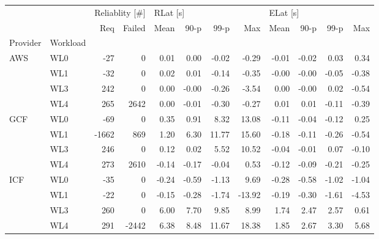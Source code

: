 \begin{tabular}{llrrrrrrrrrr}
\toprule
    &     & \multicolumn{2}{l}{Reliablity [\#]} & \multicolumn{4}{l}{RLat [s]} & \multicolumn{4}{l}{ELat [s]} \\
    &     &            Req & Failed &     Mean &  90-p &  99-p &    Max &     Mean &  90-p &  99-p &   Max \\
Provider & Workload &                &        &          &       &       &        &          &       &       &       \\
\midrule
AWS & WL0 &            -27 &      0 &     0.01 &  0.00 & -0.02 &  -0.29 &    -0.01 & -0.02 &  0.03 &  0.34 \\
    & WL1 &            -32 &      0 &     0.02 &  0.01 & -0.14 &  -0.35 &    -0.00 & -0.00 & -0.05 & -0.38 \\
    & WL3 &            242 &      0 &     0.00 & -0.00 & -0.26 &  -3.54 &     0.00 & -0.00 &  0.02 & -0.54 \\
    & WL4 &            265 &   2642 &     0.00 & -0.01 & -0.30 &  -0.27 &     0.01 &  0.01 & -0.11 & -0.39 \\
GCF & WL0 &            -69 &      0 &     0.35 &  0.91 &  8.32 &  13.08 &    -0.11 & -0.04 & -0.12 &  0.25 \\
    & WL1 &          -1662 &    869 &     1.20 &  6.30 & 11.77 &  15.60 &    -0.18 & -0.11 & -0.26 & -0.54 \\
    & WL3 &            246 &      0 &     0.12 &  0.02 &  5.52 &  10.52 &    -0.04 & -0.01 &  0.07 & -0.10 \\
    & WL4 &            273 &   2610 &    -0.14 & -0.17 & -0.04 &   0.53 &    -0.12 & -0.09 & -0.21 & -0.25 \\
ICF & WL0 &            -35 &      0 &    -0.24 & -0.59 & -1.13 &   9.69 &    -0.28 & -0.58 & -1.02 & -1.04 \\
    & WL1 &            -22 &      0 &    -0.15 & -0.28 & -1.74 & -13.92 &    -0.19 & -0.30 & -1.61 & -4.53 \\
    & WL3 &            260 &      0 &     6.00 &  7.70 &  9.85 &   8.99 &     1.74 &  2.47 &  2.57 &  0.61 \\
    & WL4 &            291 &  -2442 &     6.38 &  8.48 & 11.67 &  18.38 &     1.85 &  2.67 &  3.30 &  5.68 \\
\bottomrule
\end{tabular}
